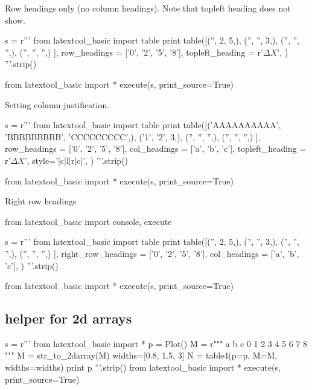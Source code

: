 \newpage
Row headings only (no column headings).
Note that topleft heading does not show.

\begin{python}
s = r'''
from latextool_basic import table
print table([('',  2, 5,),
             ('', '', 3,),
             ('', '', '',),
             ('', '', '',)
            ],
            row_headings = ['0', '2', '5', '8'],
            topleft_heading = r'$\Delta X$',
           )
'''.strip()

from latextool_basic import *
execute(s, print_source=True)
\end{python}






\newpage
Setting column justification.
\begin{python}
s = r'''
from latextool_basic import table
print table([('AAAAAAAAAA',  'BBBBBBBBB', 'CCCCCCCCC',),
             ('1', '2', 3,),
             ('', '', '',),
             ('', '', '',)
            ],
            row_headings = ['0', '2', '5', '8'],
            col_headings = ['a', 'b', 'c'],
            topleft_heading = r'$\Delta X$',
            style='|c|l|r|c|',
           )
'''.strip()

from latextool_basic import *
execute(s, print_source=True)
\end{python}


\newpage
Right row headings

\begin{python}
from latextool_basic import console, execute

s = r'''
from latextool_basic import table
print table([('',  2, 5,),
             ('', '', 3,),
             ('', '', '',),
             ('', '', '',)
            ],
            right_row_headings = ['0', '2', '5', '8'],
            col_headings = ['a', 'b', 'c'],
           )
'''.strip()

from latextool_basic import *
execute(s, print_source=True)
\end{python}

\newpage{}
\newpage{}
\newpage{}

\newpage\subsection{helper for 2d arrays}

\begin{python}
s = r'''
from latextool_basic import *
p = Plot()
M = r"""
a b c
0 1 2
3 4 5
6 7 8
"""
M = str_to_2darray(M)
widths=[0.8, 1.5, 3]
N = table4(p=p, M=M, widths=widths)
print p
'''.strip()
from latextool_basic import *
execute(s, print_source=True)
\end{python}

